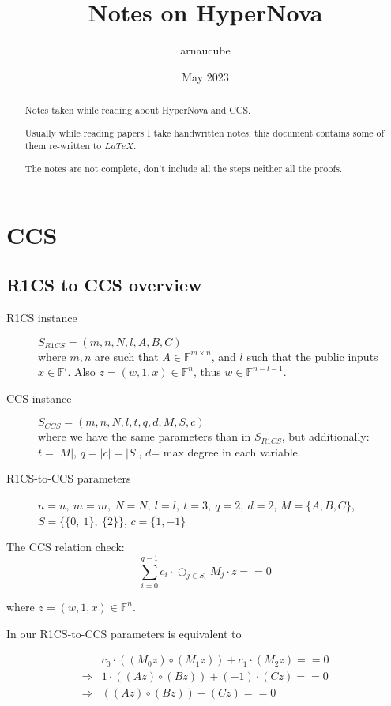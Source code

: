 \documentclass{article}
\title{Notes on HyperNova}
\author{arnaucube}
\date{May 2023}
\theoremstyle{definition}
\begin{document}
\maketitle

\begin{abstract}
	Notes taken while reading about HyperNova \cite{cryptoeprint:2023/573} and CCS\cite{cryptoeprint:2023/552}.

	Usually while reading papers I take handwritten notes, this document contains some of them re-written to $LaTeX$.

	The notes are not complete, don't include all the steps neither all the proofs.
\end{abstract}

\tableofcontents


\section{CCS}
\subsection{R1CS to CCS overview}

\begin{description}
	\item[R1CS instance] $S_{R1CS} = (m, n, N, l, A, B, C)$\\
		where $m, n$ are such that $A \in \mathbb{F}^{m \times n}$, and $l$ such that the public inputs $x \in \mathbb{F}^l$. Also $z=(w, 1, x) \in \mathbb{F}^n$, thus $w \in \mathbb{F}^{n-l-1}$.
	\item[CCS instance] $S_{CCS} = (m, n, N, l, t, q, d, M, S, c)$\\
		where we have the same parameters than in $S_{R1CS}$, but additionally:\\
		$t=|M|$, $q = |c| = |S|$, $d$= max degree in each variable.
	\item[R1CS-to-CCS parameters] $n=n,~ m=m,~ N=N,~ l=l,~ t=3,~ q=2,~ d=2$, $M=\{A,B,C\}$, $S=\{\{0,~1\},~ \{2\}\}$, $c=\{1,-1\}$
\end{description}

The CCS relation check:
$$\sum_{i=0}^{q-1} c_i \cdot \bigcirc_{j \in S_i} M_j \cdot z ==0$$

where $z=(w, 1, x) \in \mathbb{F}^n$.

In our R1CS-to-CCS parameters is equivalent to

\begin{align*}
	&c_0 \cdot ( (M_0 z) \circ (M_1 z) ) + c_1 \cdot (M_2 z) ==0\\
	\Longrightarrow &1 \cdot ( (A z) \circ (B z) ) + (-1) \cdot (C z) ==0\\
	\Longrightarrow &( (A z) \circ (B z) ) - (C z) ==0
\end{align*}
\end{document}
